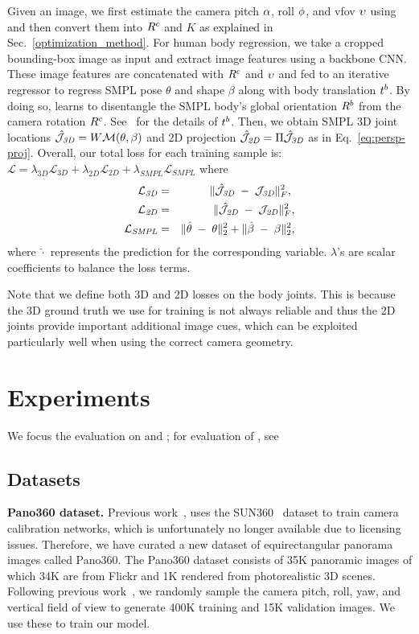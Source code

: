 \documentclass[10pt,twocolumn,letterpaper,usenames,dvipsnames]{article}
\begin{document}
Given an image, we first estimate the camera pitch $\alpha$, roll $\phi$, and vfov $\upsilon$ using \camcalib and then convert them into $R^c$ and $K$ as explained in Sec.~\ref{optimization_method}. For human body regression, we take a cropped bounding-box image as input and extract image features using a backbone CNN. 
These image features are concatenated with $R^c$ and $\upsilon$ and fed to an iterative regressor \cite{kanazawa_hmr} 
to regress SMPL pose $\theta$ and shape $\beta$ along with body translation $t^b$. 
By doing so, \methodname learns to disentangle the SMPL body's global orientation $R^b$ from the camera rotation $R^c$. See \supmat~for the details of $t^b$.
Then, we obtain SMPL 3D joint locations $\hat{\mathcal{J}}_{\mathit{3D}}= W \mathcal{M}(\theta, \beta)$ and 2D projection $\hat{\mathcal{J}}_{\mathit{2D}}=\Pi \hat{\mathcal{J}}_{\mathit{3D}}$ as in Eq.~\ref{eq:persp-proj}.
Overall, our total loss for each training sample is:
$\mathcal{L} = \lambda_{3D}\mathcal{L}_{3D} + \lambda_{2D}\mathcal{L}_{2D} + \lambda_{SMPL} \mathcal{L}_{SMPL}$ where 
\begin{eqnarray}
\mathcal{L}_{\mathit{3D}} &= &  \| \hat{\mathcal{J}}_{\mathit{3D}} \; - \; \mathcal{J}_{\mathit{3D}} \|_F^2 \text{,  } \\
\mathcal{L}_{\mathit{2D}} &= & \| \hat{\mathcal{J}}_{\mathit{2D}} \; - \; \mathcal{J}_{\mathit{2D}} \|_F^2, \\
\mathcal{L}_{\mathit{SMPL}} &= & \| \hat{\theta} \; - \; \theta \|_2^2 + \| \hat{\beta} \; - \; \beta \|_2^2 \text{,}
\end{eqnarray}
where $\hat{\cdot}$ represents the prediction for the corresponding variable. $\lambda$'s are scalar coefficients to balance the loss terms. 

Note that we define both 3D and 2D losses on the body joints.
This is because the 3D ground truth we use for training is not always reliable and thus the 2D joints provide important additional image cues, 
which can be exploited particularly well when using the correct camera geometry.
 \section{Experiments}
\label{experiments}
We focus the evaluation on \camcalib and \methodname; for evaluation of \smplify, see \supmat

\subsection{Datasets}

\textbf{Pano360 dataset.} Previous work~\cite{Hold-Geoffroy_2018_CVPR, zhu2020single}, uses the SUN360~\cite{xiao2012recognizing} dataset to train camera calibration networks, which is unfortunately no longer available due to licensing issues. Therefore, we have curated a new dataset of equirectangular panorama images called Pano360. The Pano360 dataset consists of 35K panoramic images of which 34K are from Flickr and 1K rendered from photorealistic 3D scenes. Following previous work~\cite{Hold-Geoffroy_2018_CVPR, zhu2020single}, we randomly sample the camera pitch, roll, yaw, and vertical field of view to generate 400K training and 15K validation images. We use these to train our \camcalib model. 
\end{document}
